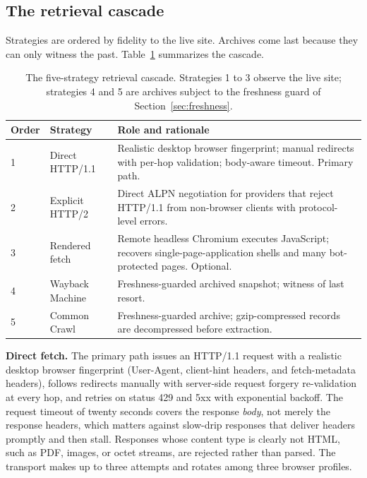 \documentclass[11pt]{article}
\begin{document}
\subsection{The retrieval cascade}
Strategies are ordered by fidelity to the live site. Archives come last because
they can only witness the past. Table~\ref{tab:cascade} summarizes the cascade.

\begin{table}[htbp]
\centering
\small
\begin{tabularx}{\textwidth}{@{}l l X@{}}
\toprule
\textbf{Order} & \textbf{Strategy} & \textbf{Role and rationale} \\
\midrule
1 & Direct HTTP/1.1 & Realistic desktop browser fingerprint; manual redirects with per-hop validation; body-aware timeout. Primary path. \\
2 & Explicit HTTP/2 & Direct ALPN negotiation for providers that reject HTTP/1.1 from non-browser clients with protocol-level errors. \\
3 & Rendered fetch & Remote headless Chromium executes JavaScript; recovers single-page-application shells and many bot-protected pages. Optional. \\
4 & Wayback Machine & Freshness-guarded archived snapshot; witness of last resort. \\
5 & Common Crawl & Freshness-guarded archive; gzip-compressed records are decompressed before extraction. \\
\bottomrule
\end{tabularx}
\caption{The five-strategy retrieval cascade. Strategies 1 to 3 observe the live
site; strategies 4 and 5 are archives subject to the freshness guard of
Section~\ref{sec:freshness}.}
\label{tab:cascade}
\end{table}
\FloatBarrier

\textbf{Direct fetch.} The primary path issues an HTTP/1.1 request with a
realistic desktop browser fingerprint (User-Agent, client-hint headers, and
fetch-metadata headers), follows redirects manually with server-side request
forgery re-validation at every hop, and retries on status 429 and 5xx with
exponential backoff. The request timeout of twenty seconds covers the response
\emph{body}, not merely the response headers, which matters against slow-drip
responses that deliver headers promptly and then stall. Responses whose content
type is clearly not HTML, such as PDF, images, or octet streams, are rejected
rather than parsed. The transport makes up to three attempts and rotates among
three browser profiles.
\end{document}
